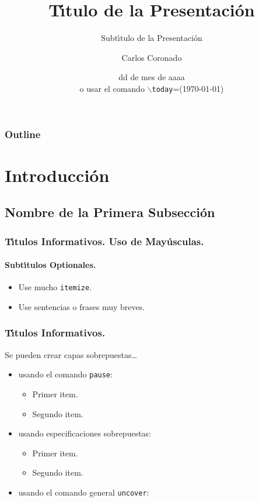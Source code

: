 \documentclass{beamer}  %
\title{T\'{\i}tulo de la Presentaci\'on}
\subtitle{Subt\'{\i}tulo de la Presentaci\'on} %
\author[Coronado] %
{Carlos Coronado}
\institute[ESFM] %
{
  Escuela Superior de F\'{\i}sica y Matem\'aticas\\
  Instituto Polit\'ecnico Nacional}
\date[dd/mm/aa] %
{dd de mes de aaaa \\o usar el comando $\mathtt{\backslash}$\texttt{today}=(\today)}
\begin{document}
\begin{frame}
  \titlepage
\end{frame}

\begin{frame}
  \frametitle{Outline}
  \tableofcontents
\end{frame}


\section{Introducci\'on}

\subsection[1$^{\mbox{\tiny ra}}$ subsecci\'on]{Nombre de la Primera Subsecci\'on}

\begin{frame}
  \frametitle{T\'{\i}tulos Informativos. Uso de May\'usculas.}
  \framesubtitle{Subt\'{\i}tulos Optionales.}

  \begin{itemize}[<+->] %
  \item Use mucho \texttt{itemize}.
  \item Use sentencias o frases muy breves.
  \end{itemize}

\end{frame}

\begin{frame}
  \frametitle{T\'{\i}tulos Informativos.}

  Se pueden crear capas sobrepuestas\dots
  \begin{itemize}
  \item usando el comando \texttt{pause}:
    \begin{itemize}
    \item Primer item.  \pause
    \item Segundo item.
    \end{itemize}
  \item usando especificaciones sobrepuestas:
    \begin{itemize}
    \item<3-> Primer item.
    \item<4-> Segundo item.
    \end{itemize}
  \item usando el comando general \texttt{uncover}:
    \begin{itemize}
    \end{itemize}
  \end{itemize}
\end{frame}
\end{document}
